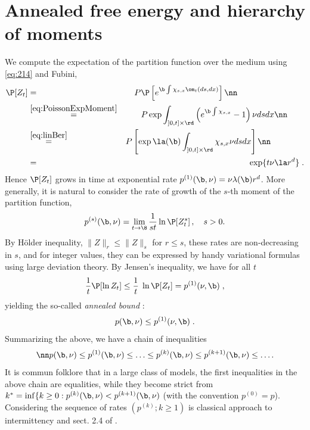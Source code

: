 \section{Annealed free energy and hierarchy of moments}
We compute the expectation of the partition function over the medium using \eqref{eq:214} and Fubini,
\begin{eqnarray}
\P[ Z_t] &=&  P \P\left[ e^{\b \int \chi_{s,x} \om_t(ds,dx)} \right] \nn \qquad \qquad \qquad \qquad
\\&\stackrel{\eqref{eq:PoissonExpMoment}}{=}&
P \exp \int_{]0,t]\times \rd} \left( e^{\b \int \chi_{s,x}}-1 \right) \nu ds dx \nn \qquad 
 \\
&\stackrel{\eqref{eq:linBer}}{=}&P \left[  \exp \la(\b)  \int_{]0,t]\times \rd}  \chi_{s,x}  \nu ds dx \right] \nn  \qquad  \qquad 
 \\&= &\label{eq:annealed}
 \exp\{ t \nu \la r^d\} \;.
\end{eqnarray}
Hence $\P[ Z_t]$ grows in time at exponential rate  $p^{(1)}(\b, \nu)= \nu \lambda(\b)r^d$. More generally, it is natural to consider the rate of growth of the $s$-th moment 
of the partition function,
$$
p^{(s)}(\b, \nu)= \lim_{t \to \8} \frac{1}{st} \ln \P[ Z_t^s]\,,\quad s >0.
$$
By H\"older inequality, $\|Z\|_r \leq \|Z\|_s$ for $r \leq s$, these rates are non-decreasing in $s$, and for integer values, they can be expressed by handy variational formulas
using large deviation theory. By Jensen's inequality, we have for all $t$
\begin{equation} \label{eq: annealedbound}
\frac{1}{t}\P[\ln Z_t] \leq   \frac{1}{t} \;\ln \P[ Z_t] = p^{(1)}(\nu,\b)\;,
\end{equation}
yielding the so-called {\em annealed bound} : $$ p(\b, \nu) \leq  p^{(1)}(\nu,\b)\;.$$  Summarizing the above,  we have a chain of inequalities
\begin{equation}
\nn
  p(\b, \nu) \leq  p^{(1)}(\b, \nu) \leq \ldots \leq  p^{(k)}(\b, \nu) \leq  p^{(k+1)}(\b, \nu) \leq \ldots . 
\end{equation}
It is commun folklore that in a large class of models, the first inequalities in the above chain are equalities, while they become strict from
$k^*= \inf \{k \geq 0: p^{(k)}(\b, \nu) <  p^{(k+1)}(\b, \nu)$ (with the convention $p^{(0)}=p$). Considering the sequence of rates $(p^{(k)}; k \geq 1)$ is
classical approach to intermittency \cite{CarmonaMolchanov, khoshnevisan, Zeldovich} and sect. 2.4 of \cite{BertiniCancrini95}. %

